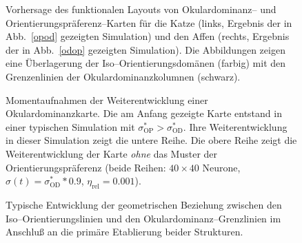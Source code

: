 \begin{figure}[t]
\begin{center}
\begin{minipage}[t]{6.2cm}
\end{minipage}
\hskip0.4cm
\begin{minipage}[t]{6.2cm}
\end{minipage}
\end{center}
\caption{Vorhersage des funktionalen Layouts von Okulardominanz-- und
Orientierungspräferenz--Karten für die Katze (links, Ergebnis der in
Abb.~\ref{opod} gezeigten Simulation) und den Affen (rechts, Ergebnis der
in Abb.~\ref{odop} gezeigten Simulation).  Die Abbildungen zeigen eine
Überlagerung der Iso--Orientierungsdomänen (farbig) mit den Grenzenlinien
der Okulardominanzkolumnen (schwarz).}
\label{simres}
\end{figure}

\begin{figure}[p]
\begin{center}
\begin{sideways}
\end{sideways}
\end{center}
\caption{Momentaufnahmen der Weiterentwicklung einer Okulardominanzkarte.
Die am Anfang gezeigte Karte entstand in einer typischen Simulation mit
$\sigma^\ast_{\text{OP}}>\sigma^\ast_{\text{OD}}$. Ihre Weiterentwicklung in
dieser Simulation zeigt die untere Reihe. Die obere Reihe zeigt die
Weiterentwicklung der Karte \emph{ohne} das Muster der
Orientierungspräferenz (beide Reihen: $40\times 40$ Neurone,
$\sigma(t)=\sigma^\ast_{\text{OD}}*0.9$, $\eta_{\text{rel}}=0.001$).}
\label{oddev}

\begin{center}
\begin{sideways}
\end{sideways}
\end{center}
\caption{Typische Entwicklung der geometrischen Beziehung zwischen den
Iso--Orientierungslinien und den Okulardominanz--Grenzlinien im Anschluß
an die primäre Etablierung beider Strukturen.}
\label{angledev}
\end{figure}

